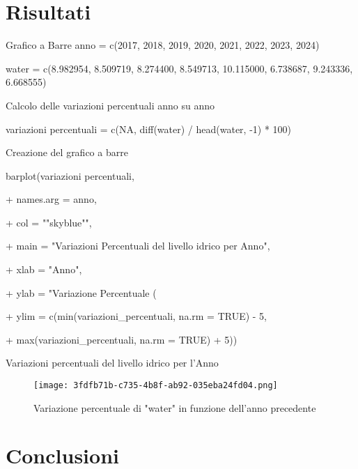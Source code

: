 \documentclass{beamer} %
\begin{document}
\section{Risultati}
\begin{frame}{Grafico a Barre}
anno = c(2017, 2018, 2019, 2020, 2021, 2022, 2023, 2024)

water = c(8.982954, 8.509719, 8.274400, 8.549713, 10.115000, 6.738687, 9.243336, 6.668555)

 
Calcolo delle variazioni percentuali anno su anno

variazioni percentuali = c(NA, diff(water) / head(water, -1) * 100)
 
Creazione del grafico a barre

barplot(variazioni percentuali,

+         names.arg = anno, 

+         col = ""skyblue"", 

+         main = "Variazioni Percentuali del livello idrico per Anno", 

+         xlab = "Anno", 

+         ylab = "Variazione Percentuale (%

+         ylim = c(min(variazioni_percentuali, na.rm = TRUE) - 5, 

+                  max(variazioni_percentuali, na.rm = TRUE) + 5))


\end{frame}
        \begin{frame}{Variazioni percentuali del livello idrico per l'Anno }
            \begin{figure}
                \centering
                \texttt{[image: 3fdfb71b-c735-4b8f-ab92-035eba24fd04.png]}
                \caption{Variazione percentuale di "water" in funzione dell'anno precedente}
                \label{fig:enter-label}
            \end{figure}
        \end{frame}


\section{Conclusioni}
\end{document}
